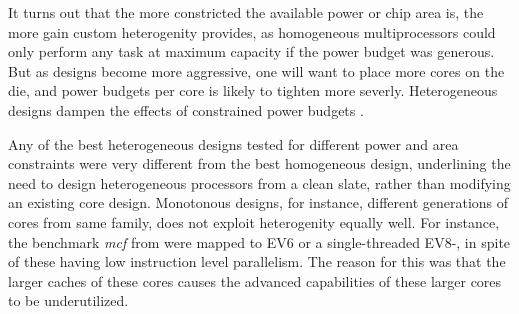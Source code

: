 It turns out that the more constricted the available power or chip area is, the more gain custom heterogenity provides, as homogeneous multiprocessors could only perform any task at maximum capacity if the power budget was generous.
But as designs become more aggressive, one will want to place more cores on the die, and power budgets per core is likely to tighten more severly.
Heterogeneous designs dampen the effects of constrained power budgets \cite{heterogeneous-arch}.

Any of the best heterogeneous designs tested for different power and area constraints were very different from the best homogeneous design, underlining the need to design heterogeneous processors from a clean slate, rather than modifying an existing core design.
Monotonous designs, for instance, different generations of cores from same family, does not exploit heterogenity equally well.
For instance, the benchmark \textit{mcf} from \cite{heterogeneous-ee} were mapped to EV6 or a single-threaded EV8-, in spite of these having low instruction level parallelism.
The reason for this was that the larger caches of these cores causes the advanced capabilities of these larger cores to be underutilized. %




